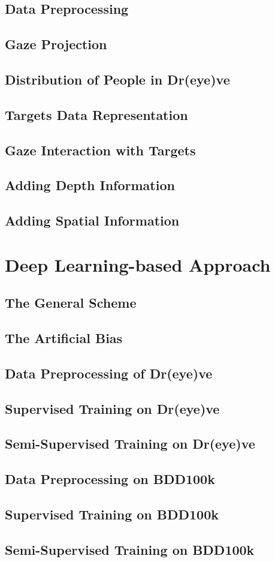 \subsection{Data Preprocessing}
\subsection{Gaze Projection}
\subsection{Distribution of People in Dr(eye)ve}

\subsection{Targets Data Representation}

\subsection{Gaze Interaction with Targets}

\subsection{Adding Depth Information}

\subsection{Adding Spatial Information}


\section {Deep Learning-based Approach}
\subsection{The General Scheme}
\subsection{The Artificial Bias}
\subsection{Data Preprocessing of Dr(eye)ve}
\subsection{Supervised Training on Dr(eye)ve}
\subsection{Semi-Supervised Training on Dr(eye)ve}
\subsection{Data Preprocessing on BDD100k}
\subsection{Supervised Training on BDD100k}
\subsection{Semi-Supervised Training on BDD100k}